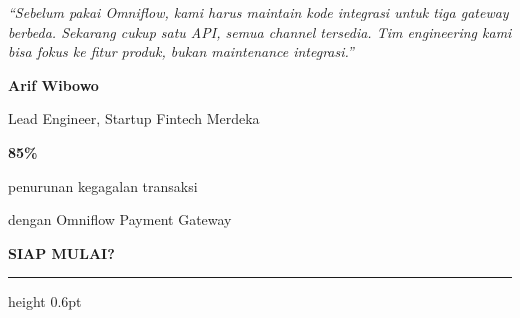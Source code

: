 \documentclass[a4paper]{article}
\newcommand{\sectiontitle}[1]{%
    \vspace{10pt}%
    {\fontsize{13}{16}\selectfont\bfseries\color{BlueDark} #1}\par\vspace{3pt}%
    {\color{BluePrimary}\hrule height 0.6pt}\par\vspace{8pt}%
}
\begin{document}
\noindent
\begin{minipage}[t]{0.485\textwidth}
    \colorbox{BlueBg}{%
        \begin{minipage}{\dimexpr\linewidth-2\fboxsep\relax}
            \vspace{6pt}
            {\fontsize{9.5}{13}\selectfont\color{TextDark}\textit{``Sebelum pakai Omniflow, kami harus maintain kode integrasi untuk tiga gateway berbeda. Sekarang cukup satu API, semua channel tersedia. Tim engineering kami bisa fokus ke fitur produk, bukan maintenance integrasi.''}}\par\vspace{4pt}
            {\fontsize{8.5}{11}\selectfont\bfseries\color{BluePrimary} Arif Wibowo}\par
            {\fontsize{8}{10}\selectfont\color{TextLight} Lead Engineer, Startup Fintech Merdeka}
            \vspace{6pt}
        \end{minipage}}
\end{minipage}%
\hfill
\begin{minipage}[t]{0.485\textwidth}
    \colorbox{BlueBg}{%
        \begin{minipage}{\dimexpr\linewidth-2\fboxsep\relax}
            \vspace{6pt}
            \begin{center}
                {\fontsize{20}{24}\selectfont\bfseries\color{GreenPrimary} 85\%}\par
                {\fontsize{9.5}{12}\selectfont\color{TextDark} penurunan kegagalan transaksi}\par
                {\fontsize{9.5}{12}\selectfont\color{TextDark} dengan Omniflow Payment Gateway}
            \end{center}
            \vspace{6pt}
        \end{minipage}}
\end{minipage}

\sectiontitle{SIAP MULAI?}
\end{document}
